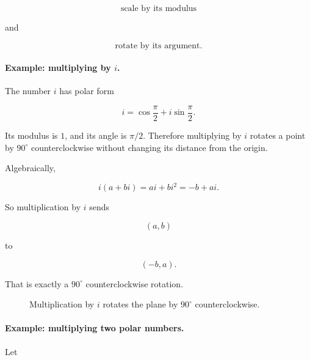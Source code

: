 \[
\text{scale by its modulus}
\]

and

\[
\text{rotate by its argument}.
\]

\paragraph{Example: multiplying by \(i\).}
The number \(i\) has polar form

\[
i=\cos\frac{\pi}{2}+i\sin\frac{\pi}{2}.
\]

Its modulus is \(1\), and its angle is \(\pi/2\).  Therefore multiplying by \(i\) rotates
a point by \(90^\circ\) counterclockwise without changing its distance from the origin.

Algebraically,

\[
i(a+bi)=ai+b i^2=-b+ai.
\]

So multiplication by \(i\) sends

\[
(a,b)
\]

to

\[
(-b,a).
\]

That is exactly a \(90^\circ\) counterclockwise rotation.

\begin{figure}[h]
\centering
{}
\caption{Multiplication by \(i\) rotates the plane by \(90^\circ\) counterclockwise.}
\label{fig:multiply-by-i-rotation}
\end{figure}

\paragraph{Example: multiplying two polar numbers.}
Let

